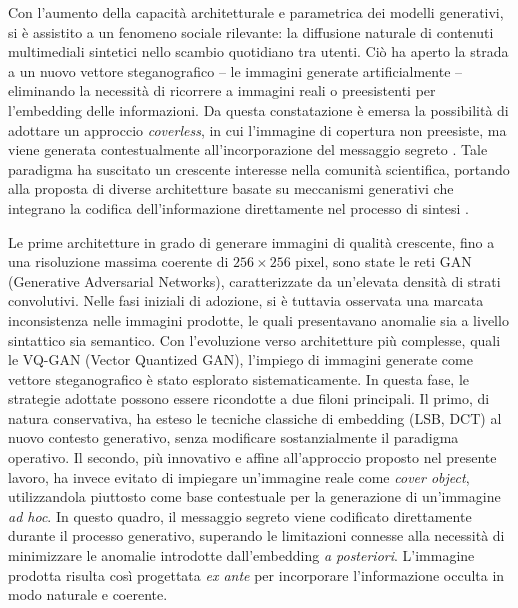 Con l'aumento della capacità architetturale e parametrica dei modelli generativi, si è assistito a un fenomeno sociale rilevante: la diffusione naturale di contenuti multimediali sintetici nello scambio quotidiano tra utenti. Ciò ha aperto la strada a un nuovo vettore steganografico -- le immagini generate artificialmente -- eliminando la necessità di ricorrere a immagini reali o preesistenti per l'embedding delle informazioni. Da questa constatazione è emersa la possibilità di adottare un approccio \emph{coverless}, in cui l'immagine di copertura non preesiste, ma viene generata contestualmente all'incorporazione del messaggio segreto \cite{ambika-2023, shi-2017}. Tale paradigma ha suscitato un crescente interesse nella comunità scientifica, portando alla proposta di diverse architetture basate su meccanismi generativi che integrano la codifica dell'informazione direttamente nel processo di sintesi \cite{dong-2025, hamid-2025, li-2024, li-2025, ma-2023, su-2024, yu-2021, zhang-2019, zhao-2025, zhou-2024, zu-2025, zhuo-2019}.

Le prime architetture in grado di generare immagini di qualità crescente, fino a una risoluzione massima coerente di $256 \times 256$ pixel, sono state le reti GAN (Generative Adversarial Networks), caratterizzate da un'elevata densità di strati convolutivi. Nelle fasi iniziali di adozione, si è tuttavia osservata una marcata inconsistenza nelle immagini prodotte, le quali presentavano anomalie sia a livello sintattico sia semantico. Con l'evoluzione verso architetture più complesse, quali le VQ-GAN (Vector Quantized GAN), l'impiego di immagini generate come vettore steganografico è stato esplorato sistematicamente. In questa fase, le strategie adottate possono essere ricondotte a due filoni principali. Il primo, di natura conservativa, ha esteso le tecniche classiche di embedding (LSB, DCT) al nuovo contesto generativo, senza modificare sostanzialmente il paradigma operativo. Il secondo, più innovativo e affine all'approccio proposto nel presente lavoro, ha invece evitato di impiegare un'immagine reale come \emph{cover object}, utilizzandola piuttosto come base contestuale per la generazione di un'immagine \emph{ad hoc}. In questo quadro, il messaggio segreto viene codificato direttamente durante il processo generativo, superando le limitazioni connesse alla necessità di minimizzare le anomalie introdotte dall'embedding \emph{a posteriori}. L'immagine prodotta risulta così progettata \emph{ex ante} per incorporare l'informazione occulta in modo naturale e coerente.

